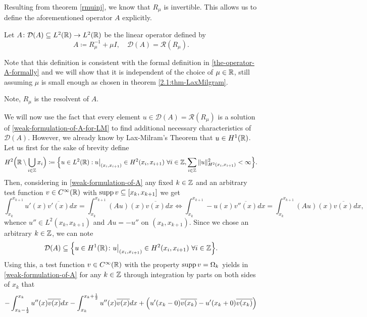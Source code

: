 Resulting from theorem \ref{rmuinj}, we know that $R_{\mu}$ is invertible. This allows us to define the aforementioned operator $A$ explicitly.
\begin{definition}
	Let $A \colon \mathcal{D}(A) \subseteq L^{2}(\mathbb{R}) \rightarrow L^{2}(\mathbb{R})$ be the linear operator defined by
	\[ A \coloneqq R_{\mu}^{-1} + \mu I, \quad \mathcal{D}(A) = \mathcal{R}(R_{\mu}). \]
\end{definition}
Note that this definition is consistent with the formal definition in \eqref{the-operator-A-formally} and we will show that it is independent of the choice of $\mu \in \mathbb{R}$, still assuming $\mu$ is small enough as chosen in theorem \ref{2.1:thm-LaxMilgram}. 
\begin{remark}
	Note, $R_{\mu}$ is the resolvent of $A$.
\end{remark}
We will now use the fact that every element $u \in \mathcal{D}(A) = \mathcal{R}(R_{\mu})$ is a solution of \eqref{weak-formulation-of-A-for-LM} to find additional necessary  characteristics of $\mathcal{D}(A)$. However, we already know by Lax-Milram's Theorem that $u \in H^{1}(\mathbb{R})$. Let us first for the sake of brevity define
\[ H^{2}\Big(\mathbb{R} \setminus \bigcup_{i \in \mathbb{Z}} x_{i} \Big) \coloneqq \Big\{ u\in L^{2}(\mathbb{R}) : u\big|_{(x_{i}, x_{i+1})} \in H^{2}(x_{i}, x_{i+1}) ~\forall i \in \mathbb{Z}, \sum_{i \in \mathbb{Z}} \|u\|^{2}_{H^{2}(x_{i}, x_{i+1})} < \infty \Big\}. \]
Then, considering in \eqref{weak-formulation-of-A} any fixed $k \in \mathbb{Z}$ and an arbitrary test function $v \in C^{\infty}(\mathbb{R})$ with $\operatorname{supp} v \subseteq [x_{k}, x_{k+1}]$ we get 
	\begin{equation}
		\int_{x_{k}}^{x_{k + 1}} u'(x) \overline{v'(x)} dx = \int_{x_{k}}^{x_{k+1}} \left(Au\right)(x) \overline{v(x)} dx \iff \int_{x_{k}}^{x_{k+1}} - u(x) \overline{v''(x)} dx = \int_{x_{k}}^{x_{k+1}} \left(Au\right)(x) \overline{v(x)} dx, \label{temp-link}
	\end{equation} 
whence $u'' \in L^{2}(x_{k}, x_{k + 1})$ and $A u = - u''$ on $(x_{k}, x_{k + 1})$. Since we chose an arbitrary $k \in \mathbb{Z}$, we can note 
	$$ \mathcal{D}(A) \subseteq \Big\{ u \in H^{1}(\mathbb{R}) \colon u\big|_{(x_{i}, x_{i+1})} \in H^{2}(x_{i}, x_{i+1}) ~\forall i \in \mathbb{Z} \Big\}. $$
Using this, a test function $v \in C^{\infty}(\mathbb{R})$ with the property $\operatorname{supp} v = \Omega_{k}$ yields in \eqref{weak-formulation-of-A} for any $k \in \mathbb{Z}$ through integration by parts on both sides of $x_{k}$ that
	\[ - \int_{x_{k}-\frac{1}{2}}^{x_{k}} u''(x) \overline{v(x)} dx - \int_{x_{k}}^{x_{k} + \frac{1}{2}} u''(x) \overline{v(x)} dx + \left( u'(x_{k}-0) \overline{v(x_{k})} - u'(x_{k} + 0) \overline{v(x_{k})} \right) \\ \]
